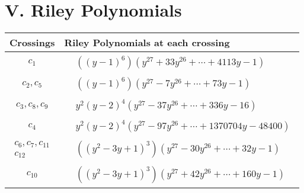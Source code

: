 \documentclass[1p]{elsarticle_modified}
\theoremstyle{definition}
\begin{document}
\centering \section*{ V. Riley Polynomials}
\begin{tabular}{m{50pt}|m{274pt}}
Crossings & \hspace{64pt}Riley Polynomials at each crossing \\
\hline $$\begin{aligned}c_{1}\end{aligned}$$&$\begin{aligned}
&((y-1)^6)(y^{27}+33 y^{26}+\cdots+4113 y-1)
\end{aligned}$\\
\hline $$\begin{aligned}c_{2},c_{5}\end{aligned}$$&$\begin{aligned}
&((y-1)^6)(y^{27}-7 y^{26}+\cdots+73 y-1)
\end{aligned}$\\
\hline $$\begin{aligned}c_{3},c_{8},c_{9}\end{aligned}$$&$\begin{aligned}
&y^2(y-2)^4(y^{27}-37 y^{26}+\cdots+336 y-16)
\end{aligned}$\\
\hline $$\begin{aligned}c_{4}\end{aligned}$$&$\begin{aligned}
&y^2(y-2)^4(y^{27}-97 y^{26}+\cdots+1370704 y-48400)
\end{aligned}$\\
\hline $$\begin{aligned}c_{6},c_{7},c_{11}\\c_{12}\end{aligned}$$&$\begin{aligned}
&((y^2-3 y+1)^3)(y^{27}-30 y^{26}+\cdots+32 y-1)
\end{aligned}$\\
\hline $$\begin{aligned}c_{10}\end{aligned}$$&$\begin{aligned}
&((y^2-3 y+1)^3)(y^{27}+42 y^{26}+\cdots+160 y-1)
\end{aligned}$\\
\hline
\end{tabular}
\vskip 2pc
\end{document}
